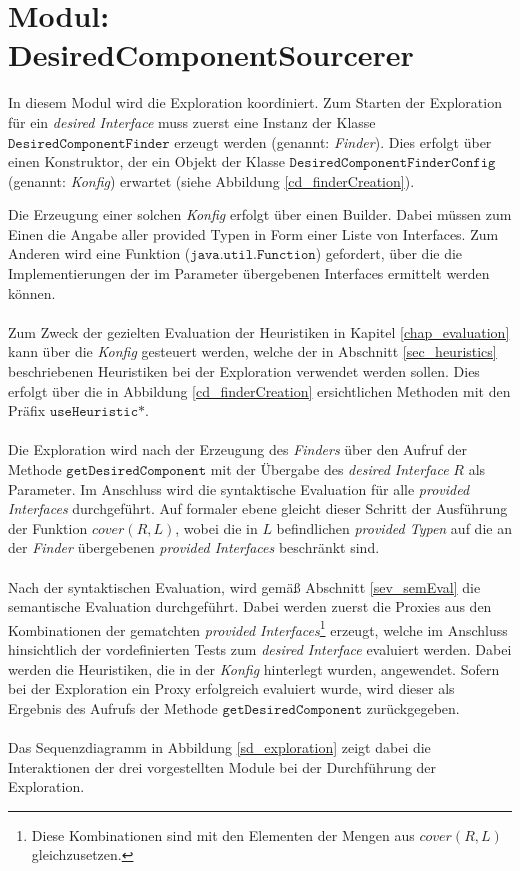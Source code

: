 \section{Modul: DesiredComponentSourcerer}
In diesem Modul wird die Exploration koordiniert. Zum Starten der Exploration für ein \emph{desired Interface} muss zuerst eine Instanz der Klasse $\texttt{DesiredComponentFinder}$ erzeugt werden (genannt: \emph{Finder}). Dies erfolgt über einen Konstruktor, der ein Objekt der Klasse $\texttt{DesiredComponentFinderConfig}$ (genannt: \emph{Konfig}) erwartet (siehe Abbildung \ref{cd_finderCreation}). 
\begin{figure}

\end{figure}\label{cd_finderCreation}
\noindent
Die Erzeugung einer solchen \emph{Konfig} erfolgt über einen Builder. Dabei müssen zum Einen die Angabe aller provided Typen in Form einer Liste von Interfaces. Zum Anderen wird eine Funktion ($\texttt{java.util.Function}$) gefordert, über die die Implementierungen der im Parameter übergebenen Interfaces ermittelt werden können.
\\\\
Zum Zweck der gezielten Evaluation der Heuristiken in Kapitel \ref{chap_evaluation} kann über die \emph{Konfig} gesteuert werden, welche der in Abschnitt \ref{sec_heuristics} beschriebenen Heuristiken bei der Exploration verwendet werden sollen. Dies erfolgt über die in Abbildung \ref{cd_finderCreation} ersichtlichen Methoden mit den Präfix $\texttt{useHeuristic*}$.
\\\\
Die Exploration wird nach der Erzeugung des \emph{Finders} über den Aufruf der Methode $\texttt{getDesiredComponent}$ mit der Übergabe des \emph{desired Interface} $R$ als Parameter. Im Anschluss wird die syntaktische Evaluation für alle \emph{provided Interfaces} durchgeführt. Auf formaler ebene gleicht dieser Schritt der Ausführung der Funktion $\mathit{cover(R,L)}$, wobei die in $L$ befindlichen \emph{provided Typen} auf die an der \emph{Finder} übergebenen \emph{provided Interfaces} beschränkt sind.
\\\\
Nach der syntaktischen Evaluation, wird gemäß Abschnitt \ref{sev_semEval} die semantische Evaluation durchgeführt. Dabei werden zuerst die Proxies aus den Kombinationen der gematchten \emph{provided Interfaces}\footnote{Diese Kombinationen sind mit den Elementen der Mengen aus $\mathit{cover(R,L)}$ gleichzusetzen.} erzeugt, welche im Anschluss hinsichtlich der vordefinierten Tests zum \emph{desired Interface} evaluiert werden. Dabei werden die Heuristiken, die in der \emph{Konfig} hinterlegt wurden, angewendet. Sofern bei der Exploration ein Proxy erfolgreich evaluiert wurde, wird dieser als Ergebnis des Aufrufs der Methode $\texttt{getDesiredComponent}$ zurückgegeben. 
\\\\
Das Sequenzdiagramm in Abbildung \ref{sd_exploration} zeigt dabei die Interaktionen der drei vorgestellten Module bei der Durchführung der Exploration.
\begin{figure}

\end{figure}\label{sd_exploration}
\noindent
